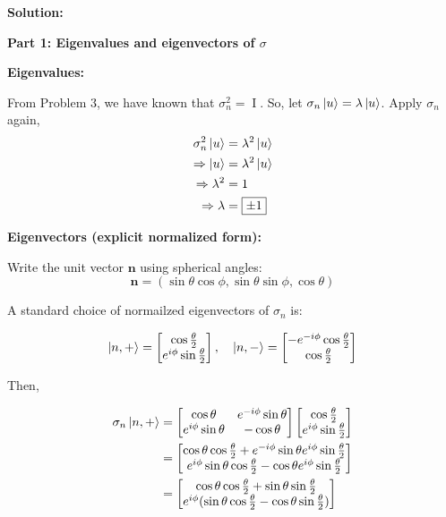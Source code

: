 \documentclass[11pt]{article}
\newenvironment{solution}
{\par\noindent\textbf{Solution:}\par}
{\vspace{1em}}
\begin{document}
\begin{solution}

\textbf{Part 1: Eigenvalues and eigenvectors of $\sigma$}

\textbf{Eigenvalues:}

From Problem 3, we have known that $\sigma_n^2 = \operatorname{I}$. So, let $\sigma_n\ket{u} = \lambda\ket{u}$. Apply $\sigma_n$ again,
\[\begin{aligned}
\sigma_n^2\ket{u} &= \lambda^2\ket{u} \\
\Rightarrow \ket{u} &= \lambda^2\ket{u} \\
\Rightarrow \lambda^2 &= 1 \\
\Rightarrow \lambda &= \boxed{\pm 1}
\end{aligned}\]

\textbf{Eigenvectors (explicit normalized form):}

Write the unit vector $\boldsymbol{n}$ using spherical angles: \[\boldsymbol{n} = (\sin{\theta}\cos{\phi}, \sin{\theta}\sin{\phi}, \cos{\theta})\]

A standard choice of normailzed eigenvectors of $\sigma_n$ is:

\[\ket{n,+} = \begin{bmatrix}\cos{\frac{\theta}{2}} \\ e^{i\phi}\sin{\frac{\theta}{2}}\end{bmatrix}, \quad \ket{n,-} = \begin{bmatrix}-e^{-i\phi}\cos{\frac{\theta}{2}} \\ \cos{\frac{\theta}{2}}\end{bmatrix}\]

Then,

\[\begin{aligned}
\sigma_n\ket{n,+} & = \begin{bmatrix}\cos{\theta} & e^{-i\phi}\sin{\theta} \\ e^{i\phi}\sin{\theta} & -\cos{\theta}\end{bmatrix} \begin{bmatrix}\cos{\frac{\theta}{2}} \\ e^{i\phi}\sin{\frac{\theta}{2}}\end{bmatrix} \\
&= \begin{bmatrix}\cos{\theta}\cos{\frac{\theta}{2}} + e^{-i\phi}\sin{\theta}e^{i\phi}\sin{\frac{\theta}{2}} \\ e^{i\phi}\sin{\theta}\cos{\frac{\theta}{2}} - \cos{\theta}e^{i\phi}\sin{\frac{\theta}{2}}\end{bmatrix} \\
& = \begin{bmatrix}\cos{\theta}\cos{\frac{\theta}{2}} + \sin{\theta}\sin{\frac{\theta}{2}} \\ e^{i\phi}(\sin{\theta}\cos{\frac{\theta}{2}} - \cos{\theta}\sin{\frac{\theta}{2}})\end{bmatrix}
\end{aligned}\]


\end{solution}
\end{document}
